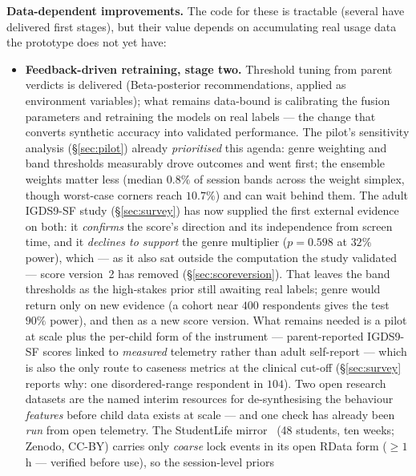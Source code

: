\documentclass[11pt,a4paper]{article}
\begin{document}
\textbf{Data-dependent improvements.}
The code for these is tractable (several have delivered first stages), but their
value depends on accumulating real usage data the prototype does not yet have:
\begin{itemize}[leftmargin=1.4em]
  \item \textbf{Feedback-driven retraining, stage two.} Threshold tuning from parent
        verdicts is delivered (Beta-posterior recommendations, applied as environment
        variables); what remains data-bound is calibrating the fusion parameters and
        retraining the models on real labels --- the change that converts synthetic
        accuracy into validated performance. The pilot's sensitivity analysis
        (\S\ref{sec:pilot}) already \emph{prioritised} this agenda: genre weighting and band
        thresholds measurably drove outcomes and went first; the ensemble weights
        matter less (median $0.8\%$ of session bands across the weight simplex,
        though worst-case corners reach $10.7\%$) and can wait behind them. The
        adult IGDS9-SF study (\S\ref{sec:survey}) has now supplied the first
        external evidence on both: it \emph{confirms} the score's direction and
        its independence from screen time, and it \emph{declines to support} the
        genre multiplier ($p = 0.598$ at $32\%$ power), which --- as it also sat
        outside the computation the study validated --- score version~2 has
        removed (\S\ref{sec:scoreversion}). That leaves the band
        thresholds as the high-stakes prior still awaiting real labels; genre
        would return only on new evidence (a cohort near $400$ respondents gives
        the test $90\%$ power), and then as a new score version. What remains
        needed is a pilot at scale plus
        the per-child form of the instrument --- parent-reported IGDS9-SF scores
        linked to \emph{measured} telemetry rather than adult self-report ---
        which is also the only route to caseness metrics at the clinical
        cut-off (\S\ref{sec:survey} reports why: one disordered-range respondent
        in $104$). Two open research datasets are
        the named interim resources for de-synthesising the behaviour
        \emph{features} before child data exists at scale --- and one check has
        already been \emph{run} from open telemetry. The StudentLife
        mirror~\cite{studentlife2014} (48 students, ten weeks; Zenodo, CC-BY)
        carries only \emph{coarse} lock events in its open RData form
        ($\geq$$1$\,h --- verified before use), so the session-level priors
$$
\end{itemize}
\end{document}
